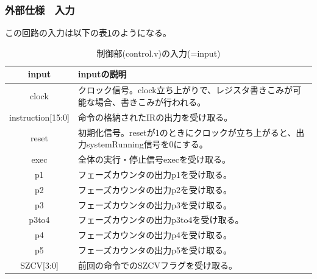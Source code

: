 \documentclass[a4j,titlepage]{jarticle}
\begin{document}
\subsubsection{外部仕様　入力}
この回路の入力は以下の表\ref{controlI}のようになる。
\begin{table}[H]
    \caption{制御部(control.v)の入力(=input)}
    \label{controlI}
    \begin{center}
    \begin {tabularx}{150mm}{|c|X|} \hline
         input & inputの説明 \\ \hline \hline
         clock & クロック信号。clock立ち上がりで、レジスタ書きこみが可能な場合、書きこみが行われる。 \\ \hline 
         instruction[15:0] & 命令の格納されたIRの出力を受け取る。 \\ \hline 
         reset & 初期化信号。resetが1のときにクロックが立ち上がると、出力systemRunning信号を0にする。 \\ \hline
         exec & 全体の実行・停止信号execを受け取る。\\ \hline
         p1 & フェーズカウンタの出力p1を受け取る。\\ \hline
         p2 & フェーズカウンタの出力p2を受け取る。\\ \hline
         p3 & フェーズカウンタの出力p3を受け取る。\\ \hline
         p3to4 & フェーズカウンタの出力p3to4を受け取る。\\ \hline
         p4 & フェーズカウンタの出力p4を受け取る。\\ \hline
         p5 & フェーズカウンタの出力p5を受け取る。\\ \hline
         SZCV[3:0] & 前回の命令でのSZCVフラグを受け取る。\\ \hline
    \end{tabularx}
    \end{center}
\end{table}
\end{document}
